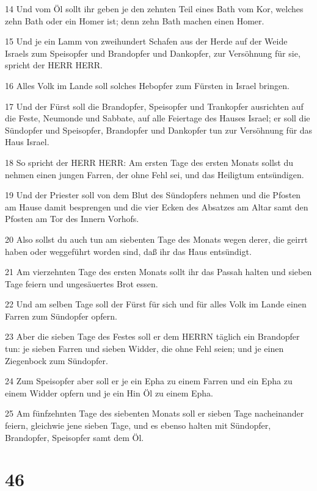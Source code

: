 \par 14 Und vom Öl sollt ihr geben je den zehnten Teil eines Bath vom Kor, welches zehn Bath oder ein Homer ist; denn zehn Bath machen einen Homer.
\par 15 Und je ein Lamm von zweihundert Schafen aus der Herde auf der Weide Israels zum Speisopfer und Brandopfer und Dankopfer, zur Versöhnung für sie, spricht der HERR HERR.
\par 16 Alles Volk im Lande soll solches Hebopfer zum Fürsten in Israel bringen.
\par 17 Und der Fürst soll die Brandopfer, Speisopfer und Trankopfer ausrichten auf die Feste, Neumonde und Sabbate, auf alle Feiertage des Hauses Israel; er soll die Sündopfer und Speisopfer, Brandopfer und Dankopfer tun zur Versöhnung für das Haus Israel.
\par 18 So spricht der HERR HERR: Am ersten Tage des ersten Monats sollst du nehmen einen jungen Farren, der ohne Fehl sei, und das Heiligtum entsündigen.
\par 19 Und der Priester soll von dem Blut des Sündopfers nehmen und die Pfosten am Hause damit besprengen und die vier Ecken des Absatzes am Altar samt den Pfosten am Tor des Innern Vorhofs.
\par 20 Also sollst du auch tun am siebenten Tage des Monats wegen derer, die geirrt haben oder weggeführt worden sind, daß ihr das Haus entsündigt.
\par 21 Am vierzehnten Tage des ersten Monats sollt ihr das Passah halten und sieben Tage feiern und ungesäuertes Brot essen.
\par 22 Und am selben Tage soll der Fürst für sich und für alles Volk im Lande einen Farren zum Sündopfer opfern.
\par 23 Aber die sieben Tage des Festes soll er dem HERRN täglich ein Brandopfer tun: je sieben Farren und sieben Widder, die ohne Fehl seien; und je einen Ziegenbock zum Sündopfer.
\par 24 Zum Speisopfer aber soll er je ein Epha zu einem Farren und ein Epha zu einem Widder opfern und je ein Hin Öl zu einem Epha.
\par 25 Am fünfzehnten Tage des siebenten Monats soll er sieben Tage nacheinander feiern, gleichwie jene sieben Tage, und es ebenso halten mit Sündopfer, Brandopfer, Speisopfer samt dem Öl.

\chapter{46}

